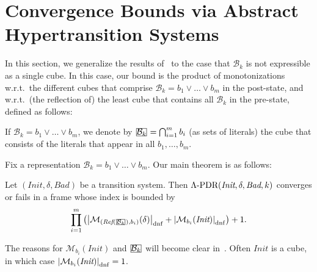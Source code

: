 \documentclass[acmsmall,screen]{acmart}
\newcommand{\card}[1]{{\left\vert{#1}\right\vert}} %
\newcommand{\Init}{{\textit{Init}}}
\newcommand{\Bad}{\textit{Bad}}
\newcommand{\tr}{\delta}
\newcommand{\bkwrch}[1]{\mathcal{B}_{#1}}
\newcommand{\dnfsize}[1]{\card{#1}_{\rm dnf}}
\newcommand{\monox}[2]{\mathcal{M}_{#2}({#1})}
\newcommand{\eepdr}{\Lambda\mbox{\rm-PDR}}
\newcommand{\bkcube}{b}
\newcommand{\reflect}[1]{\textit{Ref}({#1})}
\newcommand\mathbox[1]{\mathord{\ThisStyle{%
  \fboxsep0\LMpt\relax\kern1\LMpt\fbox{$\SavedStyle#1$}\kern1\LMpt}}}
\newcommand{\cubejoin}[1]{\mathbox{#1}}
\begin{document}
%
%

%
%

%
%
%
%
%
%
%
%
%
%
%
%

%
%

%
%

%
%
%
%
%

%
%
%
%
%
%
%
%
%
%
\section{Convergence Bounds via Abstract Hypertransition Systems}
\label{sec:hyper-all}
In this section, we generalize the results of~ to the case that $\bkwrch{k}$ is not expressible as a single cube.
In this case, our bound is the product of monotonizations w.r.t.\ the different cubes that comprise $\bkwrch{k} = \bkcube_1 \lor \ldots \lor \bkcube_m$ in the post-state, and w.r.t.\ (the reflection of) the least cube that contains all $\bkwrch{k}$ in the pre-state, defined as follows:
%
%
%
%
%
\begin{definition}
If $\bkwrch{k}=\bkcube_1 \lor \ldots \lor \bkcube_m$, we denote by $\cubejoin{\bkwrch{k}} = \bigcap_{i=1}^{m}{\bkcube_i}$ (as sets of literals) the cube that consists of the literals that appear in all $\bkcube_1,\ldots,\bkcube_m$.
\end{definition}
%
%
%

Fix a representation $\bkwrch{k}=\bkcube_1 \lor \ldots \lor \bkcube_m$.
Our main theorem is as follows:
\begin{theorem}
\label{thm:abstract-hyperdiamter-bound}
Let $(\Init,\tr,\Bad)$ be a transition system.
Then $\eepdr(\Init,\tr,\Bad,k)$ converges or fails in a frame whose index is bounded by
\begin{equation*}
	\prod_{i=1}^{m}{\left(
					\dnfsize{\monox{\tr}{(\reflect{\cubejoin{\bkwrch{k}}},\bkcube_i)}}
					+
					\dnfsize{\monox{\Init}{\bkcube_i}}
					\right)
				}
	+
	1.
\end{equation*}
\end{theorem}
The reasons for $\monox{\Init}{\bkcube_i}$ and $\cubejoin{\bkwrch{k}}$ will become clear in~.
%
Often $\Init$ is a cube, in which case $\dnfsize{\monox{\Init}{\bkcube_i}}=1$.
%
%
\end{document}
